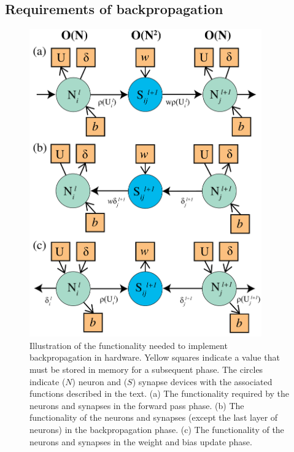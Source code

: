 \documentclass[utf8]{frontiersSCNS}
\begin{document}
\begin{appendices}

\subsection{Requirements of backpropagation}

\begin{figure}
\begin{center}
\includegraphics[width=10cm]{figures/back_prop_sb.pdf}
\end{center}
\caption{Illustration of the functionality needed to implement backpropagation in hardware. Yellow squares indicate a value that must be stored in memory for a subsequent phase. The circles indicate ($N$) neuron and ($S$) synapse devices with the associated functions described in the text. (a) The functionality required by the neurons and synapses in the forward pass phase. (b) The functionality of the neurons and synapses (except the last layer of neurons) in the backpropagation phase. (c) The functionality of the neurons and synapses in the weight and bias update phase.} \label{fig:back_prop}
\end{figure}


\end{appendices}
\end{document}
